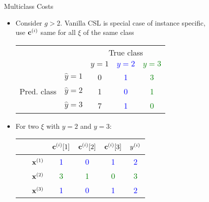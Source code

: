 \documentclass[11pt,compress,t,notes=noshow, xcolor=table]{beamer}
\begin{document}
\begin{vbframe}{Multiclass Costs}
    \begin{itemize}

        \item Consider $g > 2$. Vanilla CSL is special case of instance specific,\\use $\mathbf{c}^{(i)}$ same for all $\xi$ of the same class
        
        \vspace{5pt}
        \begin{center}
                            \begin{tabular}{cc|ccc}
        			& &\multicolumn{3}{c}{True class} \\
        			& & $y=1$ & \textcolor{blue}{$y=2$} & \textcolor{green}{$y=3$}  \\
        			\hline
        			\multirow{3}{*}{\parbox{0.6cm}{Pred.  class}} & $\hat y=1$ & 0 & \textcolor{blue}{1} & \textcolor{green}{3}\\
        			& $\hat y=2$ & 1 & \textcolor{blue}{0} & \textcolor{green}{1}\\
                        & $\hat y=3$ & 7 & \textcolor{blue}{1} & \textcolor{green}{0}\\
                \end{tabular}
        \end{center}
        \vspace{5pt}
        
        \item For two $\xi$ with $y=2$ and $y = 3$: %
                \vspace{5pt}

                \begin{center}
                            \begin{tabular}{cc|cccc}\
        			& & $\mathbf{c}^{(i)}[1]$ & $\mathbf{c}^{(i)}[2]$ & $\mathbf{c}^{(i)}[3]$ & $y^{(i)}$ \\
        			\hline & $\mathbf{x}^{(1)}$ & \textcolor{blue}{1} & \textcolor{blue}{0} & \textcolor{blue}{1} & \textcolor{blue}{2}\\
        			& $\mathbf{x}^{(2)}$ & \textcolor{green}{3} & \textcolor{green}{1} & \textcolor{green}{0} & \textcolor{green}{3}\\
                        & $\mathbf{x}^{(3)}$ & \textcolor{blue}{1} & \textcolor{blue}{0} & \textcolor{blue}{1} & \textcolor{blue}{2}\\
                \end{tabular}
        \end{center}


\end{itemize}
\end{vbframe}
\end{document}
